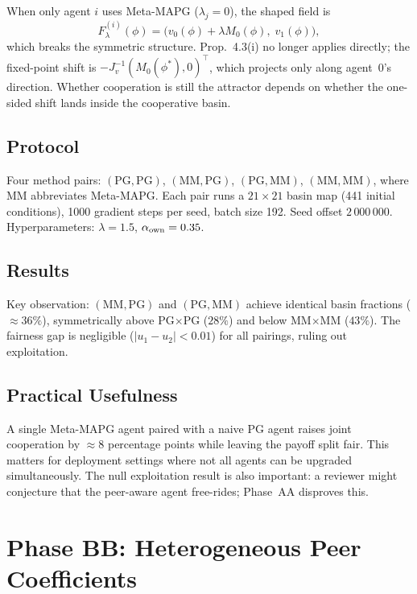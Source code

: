 \documentclass[11pt,a4paper]{article}
\begin{document}
When only agent $i$ uses Meta-MAPG ($\lambda_j=0$), the shaped field is
\[
  F^{(i)}_\lambda(\phi) = \bigl(v_0(\phi)+\lambda M_0(\phi),\; v_1(\phi)\bigr),
\]
which breaks the symmetric structure. Prop.~4.3(i) no longer applies directly;
the fixed-point shift is $-J_v^{-1}(M_0(\phi^*),0)^\top$, which projects
only along agent~0's direction. Whether cooperation is still the attractor
depends on whether the one-sided shift lands inside the cooperative basin.

\subsection{Protocol}

Four method pairs: $(\text{PG},\text{PG})$, $(\text{MM},\text{PG})$,
$(\text{PG},\text{MM})$, $(\text{MM},\text{MM})$, where MM abbreviates
Meta-MAPG. Each pair runs a $21\times21$ basin map (441 initial conditions),
1000 gradient steps per seed, batch size 192.
Seed offset $2\,000\,000$. Hyperparameters: $\lambda=1.5$, $\alpha_{\rm own}=0.35$.

\subsection{Results}



Key observation: $(\text{MM},\text{PG})$ and $(\text{PG},\text{MM})$ achieve
identical basin fractions ($\approx36\%$), symmetrically above PG$\times$PG
($28\%$) and below MM$\times$MM ($43\%$). The fairness gap is negligible
($|u_1-u_2|<0.01$) for all pairings, ruling out exploitation.

\subsection{Practical Usefulness}

A single Meta-MAPG agent paired with a naive PG agent raises joint cooperation
by $\approx8$ percentage points while leaving the payoff split fair. This
matters for deployment settings where not all agents can be upgraded
simultaneously. The null exploitation result is also important: a reviewer
might conjecture that the peer-aware agent free-rides; Phase~AA disproves this.

\section{Phase BB: Heterogeneous Peer Coefficients}
\label{sec:bb}
\end{document}
